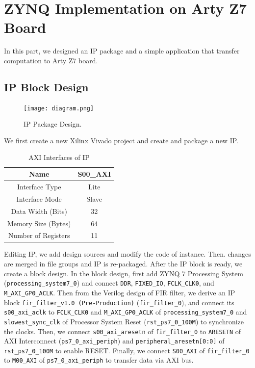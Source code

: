 \documentclass[a4paper]{article}
\begin{document}
\section{ZYNQ Implementation on Arty Z7 Board}
In this part, we designed an IP package and a simple application that transfer computation to Arty Z7 board.
\subsection{IP Block Design}
\begin{figure}[H]
    \centering
    \texttt{[image: diagram.png]}
    \caption{IP Package Design.}
\end{figure}
We first create a new Xilinx Vivado project and create and package a new IP.
\begin{table}[H]
    \centering
    \begin{tabular}{|c|c|}
        \hline
        Name&S00\_AXI\\
        \hline
        Interface Type&Lite\\
        \hline
        Interface Mode&Slave\\
        \hline
        Data Width (Bits)&32\\
        \hline
        Memory Size (Bytes)&64\\
        \hline
        Number of Registers&11\\
        \hline
    \end{tabular}
    \caption{AXI Interfaces of IP \protect\footnotemark}
\end{table}
Editing IP, we add design sources and modify the code of instance. Then. changes are merged in file groups and IP is re-packaged. After the IP block is ready, we create a block design. In the block design, first add ZYNQ 7 Processing System (\texttt{processing\_system7\_0}) and connect \texttt{DDR}, \texttt{FIXED\_IO}, \texttt{FCLK\_CLK0}, and \texttt{M\_AXI\_GP0\_ACLK}. Then from the Verilog design of FIR filter, we derive an IP block \texttt{fir\_filter\_v1.0 (Pre-Production)} (\texttt{fir\_filter\_0}), and connect its \texttt{s00\_axi\_aclk} to \texttt{FCLK\_CLK0} and \texttt{M\_AXI\_GP0\_ACLK} of \texttt{processing\_system7\_0} and \texttt{slowest\_sync\_clk} of Processor System Reset (\texttt{rst\_ps7\_0\_100M}) to synchronize the clocks. Then, we connect \texttt{s00\_axi\_aresetn} of \texttt{fir\_filter\_0} to \texttt{ARESETN} of AXI Interconnect (\texttt{ps7\_0\_axi\_periph}) and \texttt{peripheral\_aresetn[0:0]} of \texttt{rst\_ps7\_0\_100M} to enable RESET. Finally, we connect \texttt{S00\_AXI} of \texttt{fir\_filter\_0} to \texttt{M00\_AXI} of \texttt{ps7\_0\_axi\_periph} to transfer data via AXI bus.
\end{document}

